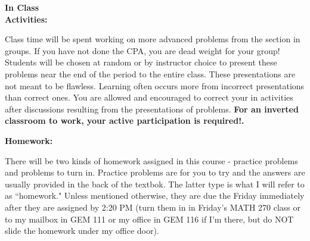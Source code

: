 \documentclass{article}
\theoremstyle{plain}
\theoremstyle{definition}
\theoremstyle{remark}
\begin{document}
\vskip0.2in \noindent
\begin{minipage}[t]{1.3in}
	\textbf{In Class} \\ \textbf{Activities:}
\end{minipage}
\begin{minipage}[t]{5.2in}
	Class time will be spent working on more advanced problems from the section in groups.  If you have not done the CPA, you are dead weight for your group!  Students will be chosen at random or by instructor choice to present these problems near the end of the period to the entire class.  These presentations are not meant to be flawless.  Learning often occurs more from incorrect presentations than correct ones.  You are allowed and encouraged to correct your in activities after discussions resulting from the presentations of problems.  \textbf{For an inverted classroom to work, your active participation is required!.}
\end{minipage}

\vskip0.2in \noindent
\begin{minipage}[t]{1.3in}
	\textbf{Homework:}
\end{minipage}
\begin{minipage}[t]{5.2in}
	  There will be two kinds of homework assigned in this course - practice problems and problems to turn in.  Practice problems are for you to try and the answers are usually provided in the back of the textbok.  The latter type is what I will refer to as ``homework."  Unless mentioned otherwise, they are due the Friday immediately after they are assigned by 2:20 PM (turn them in in Friday's MATH 270 class or to my mailbox in GEM 111 or my office in GEM 116 if I'm there, but do NOT slide the homework under my office door).
\end{minipage}
\end{document}
